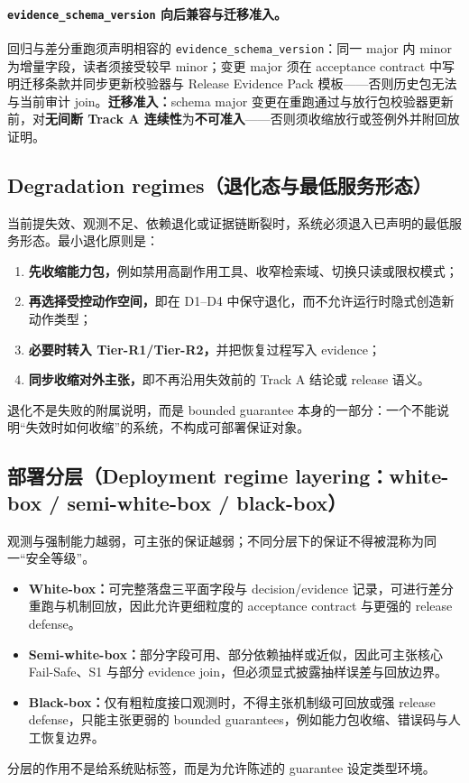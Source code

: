 \documentclass[11pt,a4paper]{report}
\begin{document}
\paragraph{\texttt{evidence\_schema\_version} 向后兼容与迁移准入。}回归与差分重跑须声明相容的 \texttt{evidence\_schema\_version}：同一 major 内 minor 为增量字段，读者须接受较早 minor；变更 major 须在 acceptance contract 中写明迁移条款并同步更新校验器与 Release Evidence Pack 模板——否则历史包无法与当前审计 join。\textbf{迁移准入：}schema major 变更在重跑通过与放行包校验器更新前，对\textbf{无间断 Track A 连续性}为\textbf{不可准入}——否则须收缩放行或签例外并附回放证明。

\subsection{Degradation regimes（退化态与最低服务形态）}
当前提失效、观测不足、依赖退化或证据链断裂时，系统必须退入已声明的最低服务形态。最小退化原则是：
\begin{enumerate}
  \item \textbf{先收缩能力包，}例如禁用高副作用工具、收窄检索域、切换只读或限权模式；
  \item \textbf{再选择受控动作空间，}即在 D1--D4 中保守退化，而不允许运行时隐式创造新动作类型；
  \item \textbf{必要时转入 Tier-R1/Tier-R2，}并把恢复过程写入 evidence；
  \item \textbf{同步收缩对外主张，}即不再沿用失效前的 Track A 结论或 release 语义。
\end{enumerate}
\noindent 退化不是失败的附属说明，而是 bounded guarantee 本身的一部分：一个不能说明“失效时如何收缩”的系统，不构成可部署保证对象。

\subsection{部署分层（Deployment regime layering：white-box / semi-white-box / black-box）}
观测与强制能力越弱，可主张的保证越弱；不同分层下的保证不得被混称为同一“安全等级”。
\begin{itemize}
  \item \textbf{White-box：}可完整落盘三平面字段与 decision/evidence 记录，可进行差分重跑与机制回放，因此允许更细粒度的 acceptance contract 与更强的 release defense。
  \item \textbf{Semi-white-box：}部分字段可用、部分依赖抽样或近似，因此可主张核心 Fail-Safe、S1 与部分 evidence join，但必须显式披露抽样误差与回放边界。
  \item \textbf{Black-box：}仅有粗粒度接口观测时，不得主张机制级可回放或强 release defense，只能主张更弱的 bounded guarantees，例如能力包收缩、错误码与人工恢复边界。
\end{itemize}
\noindent 分层的作用不是给系统贴标签，而是为允许陈述的 guarantee 设定类型环境。
\end{document}
